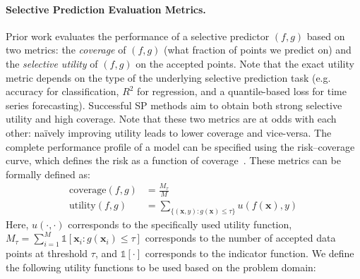 \paragraph{Selective Prediction Evaluation Metrics.} Prior work evaluates the performance of a selective predictor $(f,g)$ based on two metrics: the \emph{coverage} of $(f,g)$ (\ie what fraction of points we predict on) and the \emph{selective utility} of $(f,g)$ on the accepted points. Note that the exact utility metric depends on the type of the underlying selective prediction task (e.g. accuracy for classification, $R^2$ for regression, and a quantile-based loss for time series forecasting). Successful SP methods aim to obtain both strong selective utility and high coverage. Note that these two metrics are at odds with each other: na\"ively improving utility leads to lower coverage and vice-versa. The complete performance profile of a model can be specified using the risk–coverage curve, which defines the risk as a function of coverage~\citep{yaniv2010riskcoveragecurve}. These metrics can be formally defined as: 
\begin{align}
    \text{coverage}(f,g) & = \frac{M_\tau}{M} \\
    \text{utility}(f,g) & = \sum_{ \{(\bm{x}, y) : g(\bm{x}) \leq \tau \} } u(f(\bm{x}), y)
\end{align}
Here, $u(\cdot, \cdot)$ corresponds to the specifically used utility function, $M_\tau = \sum_{i=1}^M \mathds{1}[\bm{x}_i : g(\bm{x}_i) \leq \tau]$ corresponds to the number of accepted data points at threshold $\tau$, and $\mathds{1}[\cdot]$ corresponds to the indicator function. We define the following utility functions to be used based on the problem domain:

